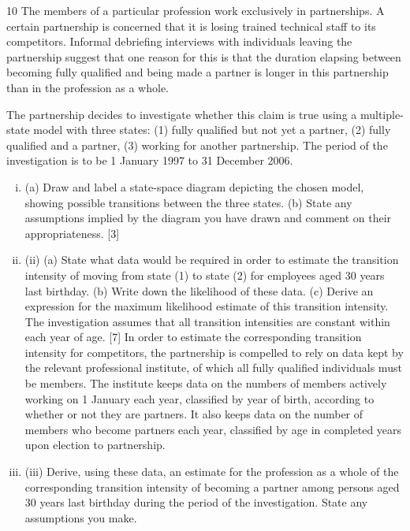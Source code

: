 \documentclass[a4paper,12pt]{article}
\begin{document}
\begin{enumerate}
10
The members of a particular profession work exclusively in partnerships. A certain partnership is concerned that it is losing trained technical staff to its competitors. Informal debriefing interviews with individuals leaving the partnership
suggest that one reason for this is that the duration elapsing between becoming fully qualified and being made a partner is longer in this partnership than in the profession as a whole.

The partnership decides to investigate whether this claim is true using a multiple-state model with three states: (1) fully qualified but not yet a partner, (2) fully qualified and a partner, (3) working for another partnership. The period of the investigation is to
be 1 January 1997 to 31 December 2006.
\begin{enumerate}[(i)]
\item (a) Draw and label a state-space diagram depicting the chosen model,
showing possible transitions between the three states.
(b) State any assumptions implied by the diagram you have drawn and
comment on their appropriateness.
[3]
\item (ii)
(a) State what data would be required in order to estimate the transition
intensity of moving from state (1) to state (2) for employees aged 30
years last birthday.
(b) Write down the likelihood of these data.
(c) Derive an expression for the maximum likelihood estimate of this
transition intensity.
The investigation assumes that all transition intensities are constant within
each year of age.
[7]
In order to estimate the corresponding transition intensity for competitors, the
partnership is compelled to rely on data kept by the relevant professional institute, of
which all fully qualified individuals must be members. The institute keeps data on the
numbers of members actively working on 1 January each year, classified by year of
birth, according to whether or not they are partners. It also keeps data on the number
of members who become partners each year, classified by age in completed years
upon election to partnership.
\item (iii)
Derive, using these data, an estimate for the profession as a whole of the
corresponding transition intensity of becoming a partner among persons aged
30 years last birthday during the period of the investigation. State any
assumptions you make.
\end{enumerate}


\end{enumerate}
\end{document}
